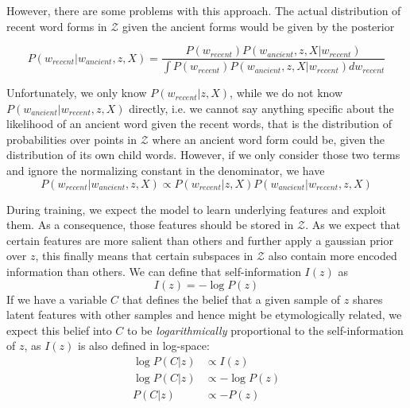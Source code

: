 \documentclass[6pt]{article}
\begin{document}
However, there are some problems with this approach.
The actual distribution of recent word forms in $\mathcal{Z}$ given the ancient forms would be given by the posterior

\begin{equation}
P(w_{recent}|w_{ancient},z,X) = \frac{P(w_{recent})P(w_{ancient},z,X|w_{recent})}{\int P(w_{recent})P(w_{ancient},z,X|w_{recent})dw_{recent}}
\end{equation}

Unfortunately, we only know $P(w_{recent}|z,X)$, while we do not know $P(w_{ancient}|w_{recent},z,X)$ directly, i.e. we cannot say anything specific about the likelihood of an ancient word given the recent words, that is the distribution of probabilities over points in $\mathcal{Z}$ where an ancient word form could be, given the distribution of its own child words.
However, if we only consider those two terms and ignore the normalizing constant in the denominator, we have
\begin{equation}
P(w_{recent}|w_{ancient},z,X) \propto P(w_{recent}|z,X)P(w_{ancient}|w_{recent},z,X)
\end{equation}


During training, we expect the model to learn underlying features and exploit them. As a consequence, those features should be stored in $\mathcal{Z}$. As we expect that certain features are more salient than others and further apply a gaussian prior over $z$, this finally means that certain subspaces in $\mathcal{Z}$ also contain more encoded information than others. We can define that self-information $I(z)$ as
\begin{equation}
I(z) = - \log P(z)
\end{equation}
If we have a variable $C$ that defines the belief that a given sample of $z$ shares latent features with other samples and hence might be etymologically related, we expect this belief into $C$ to be \textit{logarithmically} proportional to the self-information of $z$, as $I(z)$ is also defined in log-space:
\begin{equation}
\begin{split}
\log P(C|z) & \propto  I(z) \\
\log P(C|z) & \propto  - \log P(z) \\
P(C|z) & \propto  - P(z) 
\end{split}
\end{equation}
\end{document}

